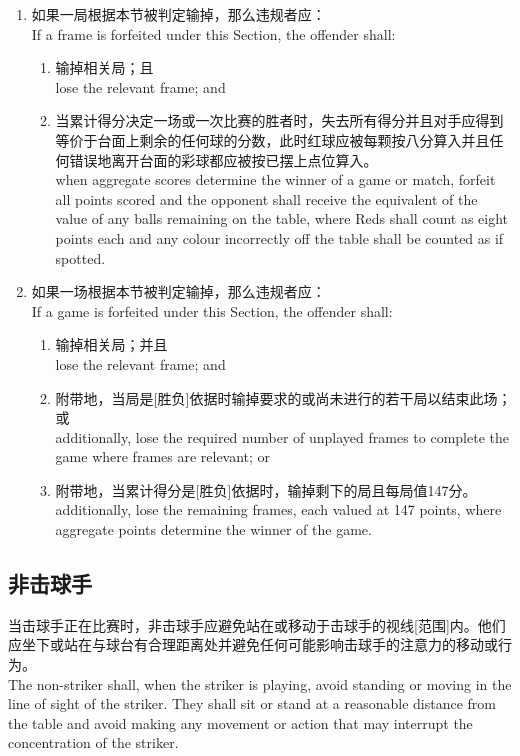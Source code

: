 \begin{enumerate}[label=(\alph*)]
    \item 如果一局根据本节被判定输掉，那么违规者应：\\
    If a frame is forfeited under this Section, the offender shall:
    \begin{enumerate}[label=(\roman*)]
        \item 输掉相关局；且\\
        lose the relevant frame; and
        \item 当累计得分决定一场或一次比赛的胜者时，失去所有得分并且对手应得到等价于台面上剩余的任何球的分数，此时红球应被每颗按八分算入并且任何错误地离开台面的彩球都应被按已摆上点位算入。\\
        when aggregate scores determine the winner of a game or match, forfeit all points scored and the opponent shall receive the equivalent of the value of any balls remaining on the table, where Reds shall count as eight points each and any colour incorrectly off the table shall be counted as if spotted.
    \end{enumerate}
    \item 如果一场根据本节被判定输掉，那么违规者应：\\
    If a game is forfeited under this Section, the offender shall:
    \begin{enumerate}[label=(\roman*)]
        \item 输掉相关局；并且\\
        lose the relevant frame; and
        \item 附带地，当局是[胜负]依据时输掉要求的或尚未进行的若干局以结束此场；或\\
        additionally, lose the required number of unplayed frames to complete the game where frames are relevant; or
        \item 附带地，当累计得分是[胜负]依据时，输掉剩下的局且每局值147分。\\
        additionally, lose the remaining frames, each valued at 147 points, where aggregate points determine the winner of the game.
    \end{enumerate}
\end{enumerate}

\subsection{非击球手}

\noindent 当击球手正在比赛时，非击球手应避免站在或移动于击球手的视线[范围]内。他们应坐下或站在与球台有合理距离处并避免任何可能影响击球手的注意力的移动或行为。\\
The non-striker shall, when the striker is playing, avoid standing or moving in the line of sight of the striker. They shall sit or stand at a reasonable distance from the table and avoid making any movement or action that may interrupt the concentration of the striker.

